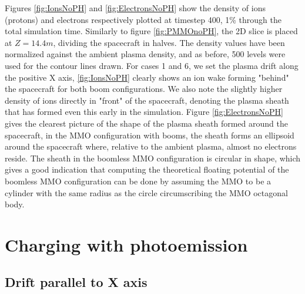Figures \ref{fig:IonsNoPH} and \ref{fig:ElectronsNoPH} show the density of ions (protons) and electrons respectively plotted at timestep 400, 1\% through the total simulation time. Similarly to figure \ref{fig:PMMOnoPH}, the 2D slice is placed at $Z = 14.4 m$, dividing the spacecraft in halves. The density values have been normalized against the ambient plasma density, and as before, 500 levels were used for the contour lines drawn. For cases 1 and 6, we set the plasma drift along the positive X axis, \ref{fig:IonsNoPH} clearly shows an ion wake forming "behind" the spacecraft for both boom configurations. We also note the slightly higher density of ions directly in "front" of the spacecraft, denoting the plasma sheath that has formed even this early in the simulation. Figure \ref{fig:ElectronsNoPH} gives the clearest picture of the shape of the plasma sheath formed around the spacecraft, in the MMO configuration with booms, the sheath forms an ellipsoid around the spacecraft where, relative to the ambient plasma, almost no electrons reside. The sheath in the boomless MMO configuration is circular in shape, which gives a good indication that computing the theoretical floating potential of the boomless MMO configuration can be done by assuming the MMO to be a cylinder with the same radius as the circle circumscribing the MMO octagonal body.

\section{Charging with photoemission}

\subsection*{Drift parallel to X axis}

